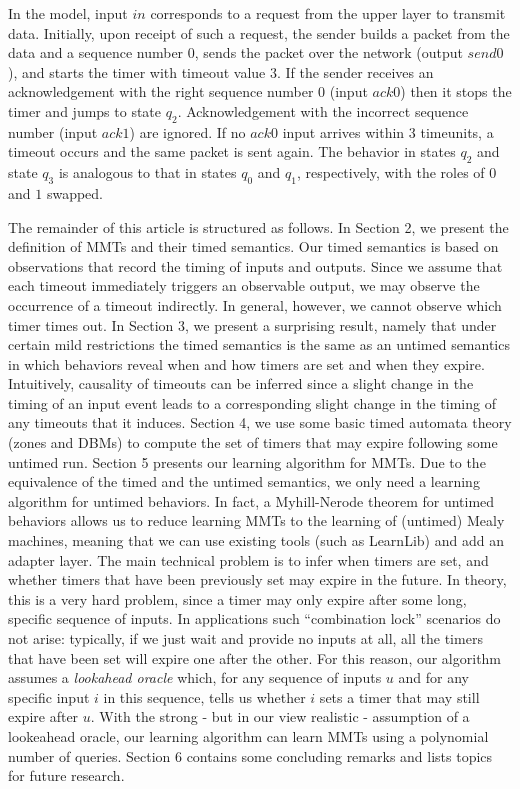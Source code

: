 In the model, input $\mathit{in}$ corresponds to a request from the upper layer to transmit data.
Initially, upon receipt of such a request, the sender builds a packet from the data and a sequence number $0$,
sends the packet over the network (output $\mathit{send0}$), and starts the timer with timeout value $3$.
If the sender receives an acknowledgement with the right sequence number $0$ (input $\mathit{ack0}$) 
then it stops the timer and jumps to state $q_2$.
Acknowledgement with the incorrect sequence number (input $\mathit{ack1}$) are ignored.
If no $\mathit{ack0}$ input arrives within $3$ timeunits, a timeout occurs and the same packet is sent again.
The behavior in states $q_2$ and state $q_3$ is analogous to that in states $q_0$ and $q_1$, respectively,
with the roles of $0$ and $1$ swapped.
\fi

The remainder of this article is structured as follows.
In Section 2, we present the definition of MMTs and their timed semantics.
Our timed semantics is based on observations that record the timing of inputs and outputs. 
Since we assume that each timeout immediately triggers an observable output, we may observe
the occurrence of a timeout indirectly. In general, however, we cannot observe which timer times out.
In Section 3, we present a surprising result, namely that under certain mild restrictions the timed semantics
is the same as an untimed semantics in which behaviors reveal when and how timers are set and when they expire.
Intuitively, causality of timeouts can be inferred since a slight change in the timing of an input event leads to a corresponding slight change in the timing of any timeouts that it induces.
Section 4, we use some basic timed automata theory (zones and DBMs) to compute the set of timers that may expire  following some untimed run.
Section 5 presents our learning algorithm for MMTs. 
Due to the equivalence of the timed and the untimed semantics, we only need a learning algorithm for untimed behaviors.
In fact, a Myhill-Nerode theorem for untimed behaviors allows us to reduce learning MMTs
to the learning of (untimed) Mealy machines, meaning that we can use existing tools (such as LearnLib) and add an adapter layer.
The main technical problem is to infer when timers are set, and whether timers that have been previously set may expire
in the future.
In theory, this is a very hard problem, since a timer may only expire after some long, specific sequence of inputs.
In applications such ``combination lock'' scenarios do not arise: typically, if we just wait and provide no inputs at all,
all the timers that have been set will expire one after the other.
For this reason, our algorithm assumes a \emph{lookahead oracle} which, for any sequence of inputs $u$ and for any specific input
$i$ in this sequence, tells us whether $i$ sets a timer that may still expire after $u$.
With the strong - but in our view realistic - assumption of a lookeahead oracle, our learning algorithm can learn MMTs
using a polynomial number of queries.
Section 6 contains some concluding remarks and lists topics for future research.

